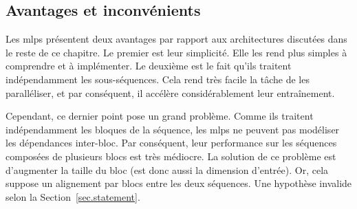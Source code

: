 \subsection{Avantages et inconvénients}

Les \glspl{mlp} présentent deux avantages par rapport aux architectures discutées dans le reste de ce chapitre.
Le premier est leur simplicité. 
Elle les rend plus simples à comprendre et à implémenter.
Le deuxième est le fait qu'ils traitent indépendamment les sous-séquences.
Cela rend très facile la tâche de les paralléliser, 
et par conséquent, il accélère considérablement leur entraînement.

Cependant, ce dernier point pose un grand problème.
Comme ils traitent indépendamment les bloques de la séquence, 
les \glspl{mlp} ne peuvent pas modéliser les dépendances inter-bloc.
Par conséquent, leur performance sur les séquences composées de plusieurs blocs est très médiocre.
La solution de ce problème est d'augmenter la taille du bloc (est donc aussi la dimension d'entrée).
Or, cela suppose un alignement par blocs entre les deux séquences.
Une hypothèse invalide selon la Section~\ref{sec.statement}.